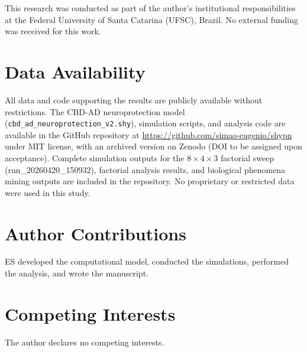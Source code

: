 \documentclass[10pt,letterpaper]{article}
\begin{document}
This research was conducted as part of the author's institutional responsibilities at the Federal University of Santa Catarina (UFSC), Brazil. No external funding was received for this work.

\section*{Data Availability}

All data and code supporting the results are publicly available without restrictions. The CBD-AD neuroprotection model (\texttt{cbd\_ad\_neuroprotection\_v2.shy}), simulation scripts, and analysis code are available in the GitHub repository at \url{https://github.com/simao-eugenio/shypn} under MIT license, with an archived version on Zenodo (DOI to be assigned upon acceptance). Complete simulation outputs for the $8 \times 4 \times 3$ factorial sweep (run\_20260420\_150932), factorial analysis results, and biological phenomena mining outputs are included in the repository. No proprietary or restricted data were used in this study.

\section*{Author Contributions}

ES developed the computational model, conducted the simulations, performed the analysis, and wrote the manuscript.

\section*{Competing Interests}

The author declares no competing interests.



\end{document}
